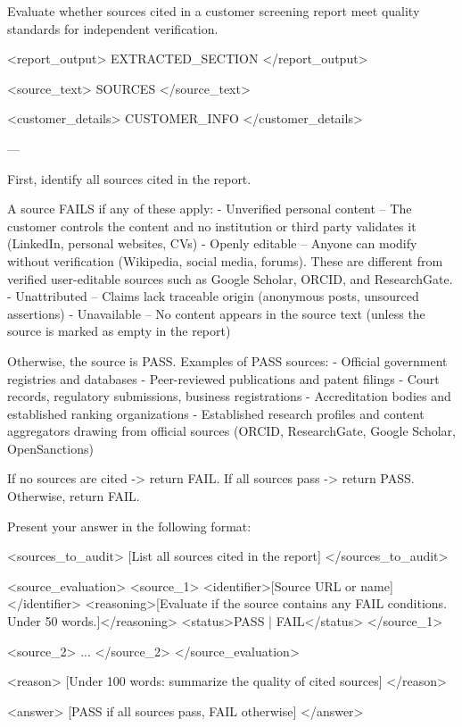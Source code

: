 \documentclass[12pt]{article}
\begin{document}
\begin{promptlisting}
Evaluate whether sources cited in a customer screening report meet quality
standards for independent verification.

<report_output>
{{EXTRACTED_SECTION}}
</report_output>

<source_text>
{{SOURCES}}
</source_text>

<customer_details>
{{CUSTOMER_INFO}}
</customer_details>

---

First, identify all sources cited in the report.

A source FAILS if any of these apply:
- Unverified personal content -- The customer controls the content and no
  institution or third party validates it (LinkedIn, personal websites, CVs)
- Openly editable -- Anyone can modify without verification (Wikipedia, social
  media, forums). These are different from verified user-editable sources such
  as Google Scholar, ORCID, and ResearchGate.
- Unattributed -- Claims lack traceable origin (anonymous posts, unsourced
  assertions)
- Unavailable -- No content appears in the source text (unless the source is
  marked as empty in the report)

Otherwise, the source is PASS. Examples of PASS sources:
- Official government registries and databases
- Peer-reviewed publications and patent filings
- Court records, regulatory submissions, business registrations
- Accreditation bodies and established ranking organizations
- Established research profiles and content aggregators drawing from official
  sources (ORCID, ResearchGate, Google Scholar, OpenSanctions)

If no sources are cited -> return FAIL.
If all sources pass -> return PASS. Otherwise, return FAIL.

Present your answer in the following format:

<sources_to_audit>
[List all sources cited in the report]
</sources_to_audit>

<source_evaluation>
<source_1>
<identifier>[Source URL or name]</identifier>
<reasoning>[Evaluate if the source contains any FAIL conditions.
Under 50 words.]</reasoning>
<status>PASS | FAIL</status>
</source_1>

<source_2>
...
</source_2>
</source_evaluation>

<reason>
[Under 100 words: summarize the quality of cited sources]
</reason>

<answer>
[PASS if all sources pass, FAIL otherwise]
</answer>
\end{promptlisting}
\end{document}
